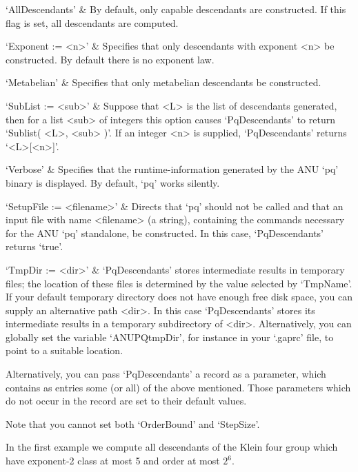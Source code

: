 `AllDescendants' &
By default, only capable descendants are constructed.  If  this  flag  is
set, all descendants are computed.

`Exponent := <n>' &
Specifies that only descendants with  exponent  <n>  be  constructed.  By
default there is no exponent law.

`Metabelian' &
Specifies that only metabelian descendants be constructed.

`SubList := <sub>' &
Suppose that <L> is the list of descendants generated, then  for  a  list
<sub> of integers this option causes `PqDescendants' to return  `Sublist(
<L>, <sub> )'. If an integer <n>  is  supplied,  `PqDescendants'  returns
`<L>[<n>]'.

`Verbose' &
Specifies that the runtime-information generated by the ANU  `pq'  binary
is displayed. By default, `pq' works silently.

`SetupFile := <filename>' &
Directs that `pq' should not be called and that an input file  with  name
<filename> (a string), containing the commands necessary for the ANU `pq'
standalone, be constructed. In this case, `PqDescendants' returns `true'.

`TmpDir := <dir>' &
`PqDescendants' stores  intermediate  results  in  temporary  files;  the
location of these files is determined by the value selected by `TmpName'.
If your default temporary directory does not have enough free disk space,
you can supply an alternative path <dir>. In  this  case  `PqDescendants'
stores its intermediate results in a  temporary  subdirectory  of  <dir>.
Alternatively, you can  globally  set  the  variable  `ANUPQtmpDir',  for
instance in your `.gaprc' file, to point to a suitable location.

\enditems

Alternatively,  you can pass `PqDescendants'  a record  as  a  parameter,
which  contains  as  entries some (or all) of the above mentioned.  Those
parameters  which do not occur  in  the record are  set  to their default
values.

Note that you cannot set both `OrderBound' and `StepSize'.

In the first example  we  compute all descendants of the Klein four group
which have exponent-2 class at most 5 and order at most $2^6$.

